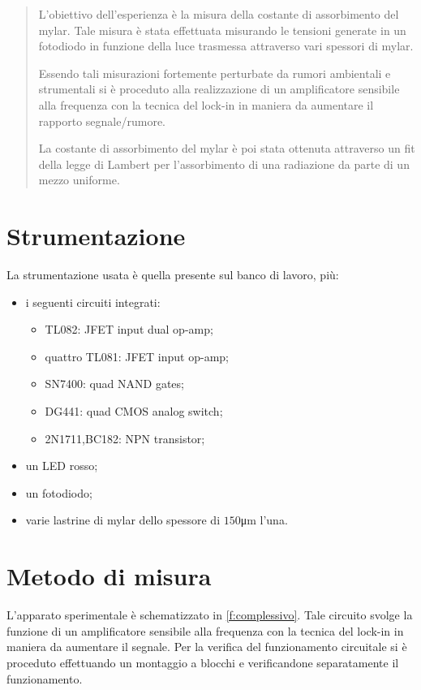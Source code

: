 \begin{abstract}
	L'obiettivo dell'esperienza è la misura della costante di assorbimento del mylar.
	Tale misura è stata effettuata misurando le tensioni generate in un fotodiodo in funzione della luce trasmessa attraverso vari spessori di mylar.
	
	Essendo tali misurazioni fortemente perturbate da rumori ambientali e strumentali
	si è proceduto alla realizzazione di un amplificatore sensibile alla frequenza con la tecnica del lock-in
	in maniera da aumentare il rapporto segnale/rumore.
	
	La costante di assorbimento del mylar è poi stata ottenuta attraverso un fit della 
	legge di Lambert per l'assorbimento di una radiazione da parte di un mezzo uniforme.
\end{abstract}

\section{Strumentazione}
La strumentazione usata è quella presente sul banco di lavoro, più:
\begin{itemize}
		\item i seguenti circuiti integrati:
		\begin{itemize}
			\item TL082: JFET input dual op-amp;
			\item quattro TL081: JFET input op-amp;
			\item SN7400: quad NAND gates;
			\item DG441: quad CMOS analog switch;
			\item 2N1711,BC182: NPN transistor;
		\end{itemize}
			\item un LED rosso;
			\item un fotodiodo;
			\item varie lastrine di mylar dello spessore di $150$\si{\micro \metre} l'una.
	\end{itemize}
	
\section{Metodo di misura}
L'apparato sperimentale è schematizzato in \figurename{ \ref{f:complessivo}}.
	Tale circuito svolge la funzione di un amplificatore sensibile alla frequenza con la tecnica del lock-in in maniera da aumentare il segnale.
	Per la verifica del funzionamento circuitale si è proceduto effettuando un montaggio a blocchi
	e verificandone separatamente il funzionamento.
	
